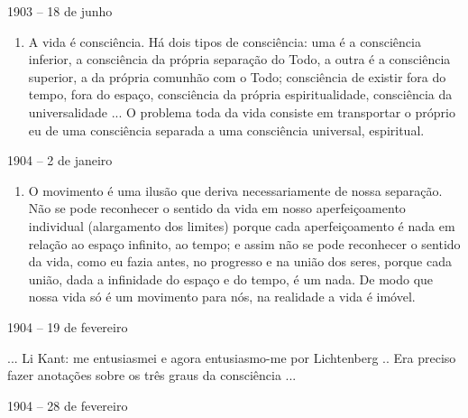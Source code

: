 1903 -- 18 de junho

\begin{enumerate}
\def\labelenumi{\arabic{enumi})}
\setcounter{enumi}{3}
\item
  A vida é consciência. Há dois tipos de consciência: uma é a
  consciência inferior, a consciência da própria separação do Todo, a
  outra é a consciência superior, a da própria comunhão com o Todo;
  consciência de existir fora do tempo, fora do espaço, consciência da
  própria espiritualidade, consciência da universalidade ... O problema
  toda da vida consiste em transportar o próprio eu de uma consciência
  separada a uma consciência universal, espiritual.
\end{enumerate}

1904 -- 2 de janeiro

\begin{enumerate}
\def\labelenumi{\arabic{enumi})}
\setcounter{enumi}{4}
\item
  O movimento é uma ilusão que deriva necessariamente de nossa
  separação. Não se pode reconhecer o sentido da vida em nosso
  aperfeiçoamento individual (alargamento dos limites) porque cada
  aperfeiçoamento é nada em relação ao espaço infinito, ao tempo; e
  assim não se pode reconhecer o sentido da vida, como eu fazia antes,
  no progresso e na união dos seres, porque cada união, dada a
  infinidade do espaço e do tempo, é um nada. De modo que nossa vida só
  é um movimento para nós, na realidade a vida é imóvel.
\end{enumerate}

1904 -- 19 de fevereiro

... Li Kant: me entusiasmei e agora entusiasmo-me por Lichtenberg .. Era
preciso fazer anotações sobre os três graus da consciência ...

1904 -- 28 de fevereiro

